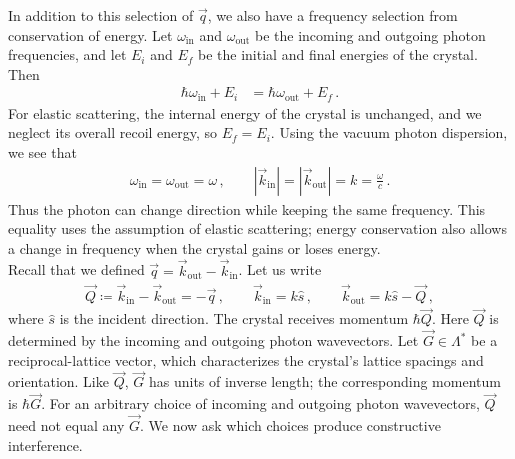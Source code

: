 \documentclass[11pt, oneside]{book}
\theoremstyle{break}
\theoremstyle{break}
\begin{document}
In addition to this selection of $\vec{q}$, we also have a frequency selection from conservation of energy. Let $\omega_{\text{in}}$ and $\omega_{\text{out}}$ be the incoming and outgoing photon frequencies, and let $E_i$ and $E_f$ be the initial and final energies of the crystal. Then
\begin{align*}
\hbar\omega_{\text{in}}+E_i
&=\hbar\omega_{\text{out}}+E_f\,.
\end{align*}
For elastic scattering, the internal energy of the crystal is unchanged, and we neglect its overall recoil energy, so $E_f=E_i$. Using the vacuum photon dispersion, we see that
\begin{align*}
\omega_{\text{in}}=\omega_{\text{out}}=\omega\,,
\qquad
|\vec{k}_{\text{in}}|=|\vec{k}_{\text{out}}|=k=\frac{\omega}{c}\,.
\end{align*}
Thus the photon can change direction while keeping the same frequency. This equality uses the assumption of elastic scattering; energy conservation also allows a change in frequency when the crystal gains or loses energy. \\

Recall that we defined $\vec{q}=\vec{k}_{\text{out}}-\vec{k}_{\text{in}}$. Let us write
\begin{align*}
\vec{Q}\coloneqq\vec{k}_{\text{in}}-\vec{k}_{\text{out}}=-\vec{q}\,,
\qquad
\vec{k}_{\text{in}}=k\hat{s}\,,
\qquad
\vec{k}_{\text{out}}=k\hat{s}-\vec{Q}\,,
\end{align*}
where $\hat{s}$ is the incident direction. The crystal receives momentum $\hbar\vec{Q}$. Here $\vec{Q}$ is determined by the incoming and outgoing photon wavevectors. Let $\vec{G}\in\Lambda^*$ be a reciprocal-lattice vector, which characterizes the crystal's lattice spacings and orientation. Like $\vec{Q}$, $\vec{G}$ has units of inverse length; the corresponding momentum is $\hbar\vec{G}$. For an arbitrary choice of incoming and outgoing photon wavevectors, $\vec{Q}$ need not equal any $\vec{G}$. We now ask which choices produce constructive interference. \\
\end{document}
